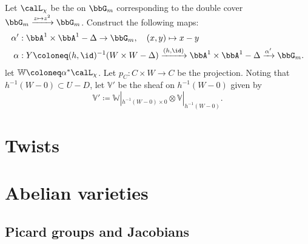 \begin{proposition}
    Let $\calL_\chi$ be the  on $\bbG_m$ corresponding to the double cover $\bbG_m \xrightarrow{z \mapsto z^2} \bbG_m$. Construct the following maps:
    \begin{align*}
    \alpha'&: \bbA^1 \times \bbA^1 -\Delta \to \bbG_m, \quad (x,y) \mapsto x-y \\
    \alpha&: Y \coloneq (h,\id)^{-1}(W \times W - \Delta) \xrightarrow{(h,\id)} \bbA^1 \times \bbA^1 - \Delta \xrightarrow{\alpha'} \bbG_m.
    \end{align*}
    let $\mathbb{W} \coloneq \alpha^* \calL_\chi$. 
    Let $p_C: C \times W \to C$ be the projection.
    Noting that $h^{-1}(W-0) \subset U-D$, let $\mathbb{V}'$ be the sheaf on $h^{-1}(W-0)$ given by 
    $$\mathbb{V}' \coloneq \mathbb{W}|_{h^{-1}(W-0) \times 0} \otimes \mathbb{V}|_{h^{-1}(W-0)}.$$
    

\end{proposition}

\section{Twists}





\appendix


\section{Abelian varieties}







\subsection{Picard groups and Jacobians}

